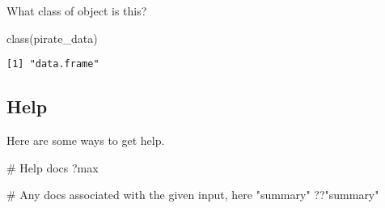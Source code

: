 \documentclass[
  letterpaper,
  DIV=11,
  numbers=noendperiod]{scrartcl}
\newenvironment{Shaded}{\begin{snugshade}}{\end{snugshade}}
\newcommand{\CommentTok}[1]{\textcolor[rgb]{0.37,0.37,0.37}{#1}}
\newcommand{\FunctionTok}[1]{\textcolor[rgb]{0.28,0.35,0.67}{#1}}
\newcommand{\NormalTok}[1]{\textcolor[rgb]{0.00,0.23,0.31}{#1}}
\newcommand{\StringTok}[1]{\textcolor[rgb]{0.13,0.47,0.30}{#1}}
\begin{document}
What class of object is this?

\begin{Shaded}
\begin{Highlighting}[]
\FunctionTok{class}\NormalTok{(pirate\_data)}
\end{Highlighting}
\end{Shaded}

\begin{verbatim}
[1] "data.frame"
\end{verbatim}

\subsection{Help}\label{help}

Here are some ways to get help.

\begin{Shaded}
\begin{Highlighting}[]
\CommentTok{\# Help docs}
\NormalTok{?max}
\end{Highlighting}
\end{Shaded}

\begin{Shaded}
\begin{Highlighting}[]
\CommentTok{\# Any docs associated with the given input, here "summary"}
\NormalTok{??}\StringTok{"summary"}
\end{Highlighting}
\end{Shaded}
\end{document}
